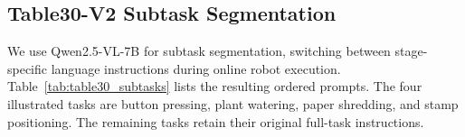 \subsection{Table30-V2 Subtask Segmentation}
\label{app:table30_training}


We use Qwen2.5-VL-7B for subtask segmentation, switching between stage-specific language instructions during online robot execution.
Table~\ref{tab:table30_subtasks} lists the resulting ordered prompts.
The four illustrated tasks are button pressing, plant watering, paper shredding, and stamp positioning. The remaining tasks retain their original full-task instructions.


